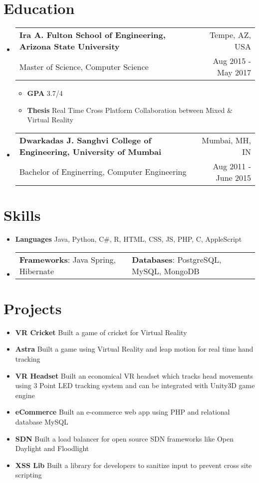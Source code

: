 \documentclass[a4paper,12pt]{article} %
\makeatletter
\newcommand{\fourElementListStart}{\begin{itemize}[label={},leftmargin=*]\setlength\itemsep{1em}}
\newcommand{\fourElementListEnd}{\end{itemize}}
\newcommand{\generalListStart}{\begin{itemize}[leftmargin=2em]\setlength\itemsep{0.02em}}
\newcommand{\generalListEnd}{\end{itemize}}
\newcommand{\fourElementItem}[4]{
	\vspace{-0.5em}\item
		\begin{tabular*}{\textwidth}{@{}l@{\extracolsep{\fill}}r@{}}
			\textbf{#1} & {\small{#2}} \\[0.2em]
			{#3} & {\small{#4}} \\[0.2em]
		\end{tabular*}\vspace{-0.7em}
}
\newcommand{\twoKeyValuePairElementItem}[4]{
	\vspace{-1em}\item
		\begin{tabular}{@{}p{7cm}p{11cm}}

			\vspace{0.5em}\textbf{#1}{: #2} & \vspace{0.5em}\textbf{#3}{: #4}

		\end{tabular}\vspace{-1.2em}
}
\newcommand{\oneKeyValuePairElement}[2]{
	\item \textbf{#1}{ #2}
}
\makeatother
\begin{document}


\vspace{0.2em}\section*{Education}

\fourElementListStart
	\fourElementItem {Ira A. Fulton School of Engineering, Arizona State University}{Tempe, AZ, USA}
	{Master of Science, Computer Science}{Aug 2015 - May 2017}
	\generalListStart
		\item \textbf{GPA} 3.7/4
		\item \textbf{Thesis} Real Time Cross Platform Collaboration between Mixed \& Virtual Reality
	\generalListEnd
	\vspace{-0.5em}\fourElementItem {Dwarkadas J. Sanghvi College of Engineering, University of Mumbai}{Mumbai, MH, IN}
	{Bachelor of Enginerring, Computer Engineering}{Aug 2011 - June 2015}
\fourElementListEnd


\vspace{0.2em}\section*{Skills}

\generalListStart
	\oneKeyValuePairElement{Languages}{Java, Python, C\#, R, HTML, CSS, JS, PHP, C, AppleScript}
	\twoKeyValuePairElementItem{Frameworks}{Java Spring, Hibernate}{Databases}{PostgreSQL, MySQL, MongoDB}
\generalListEnd


\vspace{0.2em}\section*{Projects}
\generalListStart
	\oneKeyValuePairElement{VR Cricket}{Built a game of cricket for Virtual Reality}
	\oneKeyValuePairElement{Astra}{Built a game using Virtual Reality and leap motion for real time hand tracking}
	\oneKeyValuePairElement{VR Headset}{Built an economical VR headset which tracks head movements using 3 Point LED tracking system and can be integrated with Unity3D game engine}
	\oneKeyValuePairElement{eCommerce}{Built an e-commerce web app using PHP and relational database MySQL}
	\oneKeyValuePairElement{SDN}{Built a load balancer for open source SDN frameworks like Open Daylight and Floodlight}
	\oneKeyValuePairElement{XSS Lib}{Built a library for developers to sanitize input to prevent cross site scripting}
\generalListEnd
\end{document}
